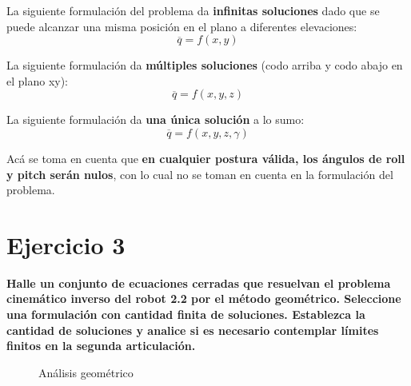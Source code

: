 \documentclass[a4paper,12pt]{article}
\begin{document}
La siguiente formulación del problema da \textbf{infinitas soluciones} dado que se puede alcanzar una misma posición en el plano a diferentes elevaciones:
\begin{equation*}
    \overline{q} = f(x, y)
\end{equation*}

La siguiente formulación da \textbf{múltiples soluciones} (codo arriba y codo abajo en el plano xy):
\begin{equation}
    \overline{q} = f(x, y, z)
    \label{problema robot 3.2}
\end{equation}

La siguiente formulación da \textbf{una única solución} a lo sumo:
\begin{equation*}
    \overline{q} = f(x, y, z, \gamma)
\end{equation*}

Acá se toma en cuenta que \textbf{en cualquier postura válida, los ángulos de roll y pitch serán nulos}, con lo cual no se toman en cuenta en la formulación del problema.

\section{Ejercicio 3}
\textbf{Halle un conjunto de ecuaciones cerradas que resuelvan el problema
cinemático inverso del robot 2.2 por el método geométrico. Seleccione una formulación con
cantidad finita de soluciones. Establezca la cantidad de soluciones y analice si es necesario
contemplar límites finitos en la segunda articulación.}

\begin{figure}[H]
    \centering
    \begin{adjustbox}{scale = 0.55, max width=\columnwidth}
    \end{adjustbox}
    \caption{Análisis geométrico}
\end{figure}
\end{document}
